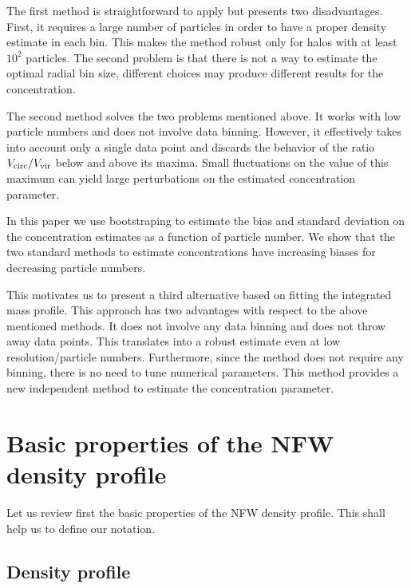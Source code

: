 \documentclass{emulateapj}
\begin{document}
The first method is straightforward to apply but presents two
disadvantages.  First, it requires a large number of particles in
order to have a proper density estimate in each bin.  This makes the
method robust only for halos with at least $10^2$ particles.  The
second problem is that there is not a way to estimate the optimal
radial bin size, different choices may produce different results for
the concentration.

The second method solves the two problems mentioned above.  
It works with low particle numbers and does not involve data binning.  
However,
it effectively takes into account only a single data point and
discards the behavior of the ratio $V_{\rm circ}/V_{\rm vir}$ below
and above its maxima.  
Small fluctuations on the value of this maximum
can yield large perturbations on the estimated concentration
parameter.

In this paper we use bootstraping to estimate the bias and standard
deviation on the concentration estimates as a function of particle
number. 
We show that the two standard methods to estimate concentrations have
increasing biases for decreasing particle numbers.  


This motivates us to present a third alternative based on fitting the
integrated mass profile.  
This approach has two advantages with respect to the above mentioned methods.  
It does not involve any data binning and does not throw away data points.  
This translates into a robust estimate even at low resolution/particle numbers.  
Furthermore, since the method does not require any binning, there is no need to
tune numerical parameters.   
This method provides a new independent method to estimate the
concentration parameter.   









\section{Basic properties of the NFW density profile}
\label{sec:basics}

Let us review first the basic properties of the NFW density profile.
This shall help us to define our notation.

\subsection{Density profile}
\end{document}
